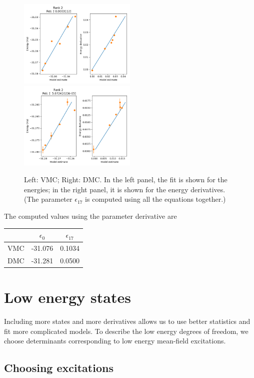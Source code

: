 \begin{figure}
\includegraphics[width=0.5\textwidth]{images/vmc_allderivs_2orb_model.png}
\includegraphics[width=0.5\textwidth]{images/dmc_allderivs_2orb_model.png}
\label{fig:2orb_deriv}
\caption{
Left: VMC; Right: DMC.
In the left panel, the fit is shown for the energies; in the right panel, it is shown for the energy derivatives.
(The parameter $\epsilon_17$ is computed using all the equations together.)}
\end{figure}

The computed values using the parameter derivative are 

\begin{tabular}{c|cc}
 & $\epsilon_{0}$ & $\epsilon_{17}$ \\\hline
VMC & -31.076 & 0.1034 \\
DMC & -31.281 & 0.0500 
\end{tabular}



\section {Low energy states}

Including more states and more derivatives allows us to use better statistics and fit more complicated models.
To describe the low energy degrees of freedom, we choose determinants corresponding to low energy mean-field excitations.

\subsection{Choosing excitations}

